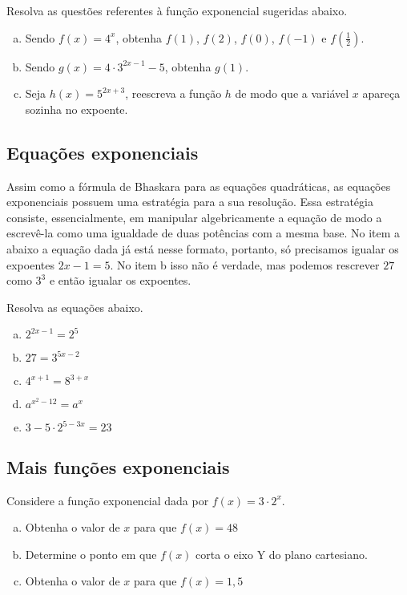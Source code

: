 \documentclass[main_estudante.tex]{subfiles}
\begin{document}
\begin{questao}
Resolva as questões referentes à função exponencial sugeridas abaixo.
\begin{enumerate}[a)]
\item Sendo $f(x)=4^x$, obtenha $f(1)$, $f(2)$, $f(0)$, $f(-1)$ e $f(\frac{1}{2})$.
\item Sendo $g(x)=4 \cdot 3^{2x-1}-5$, obtenha $g(1)$.
\item Seja $h(x)=5^{2x+3}$, reescreva a função $h$ de modo que a variável $x$ apareça sozinha no expoente.
\end{enumerate}
\end{questao}

\subsection*{Equações exponenciais}

Assim como a fórmula de Bhaskara para as equações quadráticas, as equações exponenciais possuem uma estratégia para a sua resolução. Essa estratégia consiste, essencialmente, em manipular algebricamente a equação de modo a escrevê-la como uma igualdade de duas potências com a mesma base. No item a abaixo a equação dada já está nesse formato, portanto, só precisamos igualar os expoentes $2x-1=5$. No item b isso não é verdade, mas podemos rescrever $27$ como $3^3$ e então igualar os expoentes.

\begin{questao}
Resolva as equações abaixo.
\begin{enumerate}[a)]
\item $2^{2x-1} = 2^5$
\item $27 = 3^{5x-2}$
\item $4^{x+1}=8^{3+x}$
\item $a^{x^2-12}=a^{x}$
\item $3-5 \cdot 2^{5-3x} = 23$
\end{enumerate}
\end{questao}

\subsection*{Mais funções exponenciais}

\begin{questao}
Considere a função exponencial dada por $f(x)=3 \cdot 2^x$.
\begin{enumerate}[a)]
\item Obtenha o valor de $x$ para que $f(x)=48$
\item Determine o ponto em que $f(x)$ corta o eixo Y do plano cartesiano.
\item Obtenha o valor de $x$ para que $f(x)=1,5$
\end{enumerate}
\end{questao}
\end{document}

